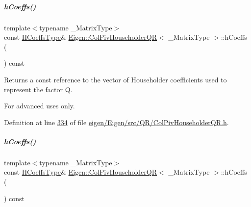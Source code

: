 \mbox{\label{group___q_r___module_ac5943d19aa5fd96340c7df6874fcb1b9}} 
\subparagraph{\texorpdfstring{h\+Coeffs()}{hCoeffs()}\hspace{0.1cm}{\footnotesize\ttfamily [1/2]}}
{\footnotesize\ttfamily template$<$typename \+\_\+\+Matrix\+Type$>$ \\
const \hyperlink{class_eigen_1_1internal_1_1_tensor_lazy_evaluator_writable}{H\+Coeffs\+Type}\& \hyperlink{group___q_r___module_class_eigen_1_1_col_piv_householder_q_r}{Eigen\+::\+Col\+Piv\+Householder\+QR}$<$ \+\_\+\+Matrix\+Type $>$\+::h\+Coeffs (\begin{DoxyParamCaption}{ }\end{DoxyParamCaption}) const\hspace{0.3cm}{\ttfamily [inline]}}

\begin{DoxyReturn}{Returns}
a const reference to the vector of Householder coefficients used to represent the factor {\ttfamily Q}.
\end{DoxyReturn}
For advanced uses only. 

Definition at line \hyperlink{eigen_2_eigen_2src_2_q_r_2_col_piv_householder_q_r_8h_source_l00334}{334} of file \hyperlink{eigen_2_eigen_2src_2_q_r_2_col_piv_householder_q_r_8h_source}{eigen/\+Eigen/src/\+Q\+R/\+Col\+Piv\+Householder\+Q\+R.\+h}.

\mbox{\label{group___q_r___module_ac5943d19aa5fd96340c7df6874fcb1b9}} 
\subparagraph{\texorpdfstring{h\+Coeffs()}{hCoeffs()}\hspace{0.1cm}{\footnotesize\ttfamily [2/2]}}
{\footnotesize\ttfamily template$<$typename \+\_\+\+Matrix\+Type$>$ \\
const \hyperlink{class_eigen_1_1internal_1_1_tensor_lazy_evaluator_writable}{H\+Coeffs\+Type}\& \hyperlink{group___q_r___module_class_eigen_1_1_col_piv_householder_q_r}{Eigen\+::\+Col\+Piv\+Householder\+QR}$<$ \+\_\+\+Matrix\+Type $>$\+::h\+Coeffs (\begin{DoxyParamCaption}{ }\end{DoxyParamCaption}) const\hspace{0.3cm}{\ttfamily [inline]}}

